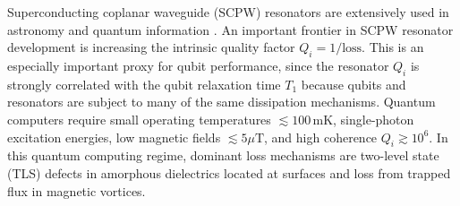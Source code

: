 \documentclass{report}
\begin{document}

Superconducting coplanar waveguide (SCPW) resonators are extensively used in astronomy\cite{day2003,mazin2012} and quantum information \cite{mariantoni2011,barends2013,jeffrey2014}.  An important frontier in SCPW resonator development is increasing the intrinsic quality factor $Q_i = 1/\text{loss}$.  This is an especially important proxy for qubit performance, since the resonator $Q_i$ is strongly correlated with the qubit relaxation time $T_1$ because qubits and resonators are subject to many of the same dissipation mechanisms.\cite{wang2015, wisbey2010, song2009a, wang2014, nsanzineza2014, martinis2005, martinis2009, gao2008}  Quantum computers require small operating temperatures $\lesssim 100\,\textrm{mK}$, single-photon excitation energies, low magnetic fields $\lesssim 5\mu\textrm{T}$, and high coherence  $Q_i \gtrsim 10^{6}$.  In this quantum computing regime, dominant loss mechanisms are two-level state (TLS) defects in amorphous dielectrics located at surfaces and loss from trapped flux in magnetic vortices.  
\end{document}
